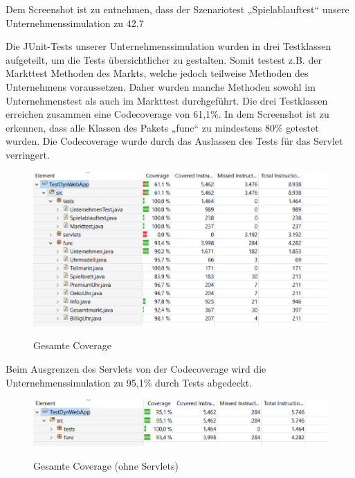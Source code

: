 Dem Screenshot ist zu entnehmen, dass der Szenariotest „Spielablauftest“ unsere Unternehmenssimulation zu 42,7 %

Die JUnit-Tests unserer Unternehmenssimulation wurden in drei Testklassen aufgeteilt, um die Tests übersichtlicher zu gestalten. Somit testest z.B. der Markttest Methoden des Markts, welche jedoch teilweise Methoden des Unternehmens voraussetzen. Daher wurden manche Methoden sowohl im Unternehmenstest als auch im Markttest durchgeführt. Die drei Testklassen erreichen zusammen eine Codecoverage von 61,1\%. In dem Screenshot ist zu erkennen, dass alle Klassen des Pakets „func“ zu mindestens 80\% getestet wurden. Die Codecoverage wurde durch das Auslassen des Tests für das Servlet verringert. 

\begin{figure}[!h]
	\centering
	\includegraphics[scale=0.8]{img/bild2_tests.png} 
	\label{fig:abb}
	\caption{Gesamte Coverage}
\end{figure}

Beim Ausgrenzen des Servlets von der Codecoverage wird die Unternehmenssimulation zu 95,1\% durch Tests abgedeckt. 

\begin{figure}[!h]
	\centering
	\includegraphics[scale=0.8]{img/bild3_tests.png} 
	\label{fig:abb}
	\caption{Gesamte Coverage (ohne Servlets)}
\end{figure}







